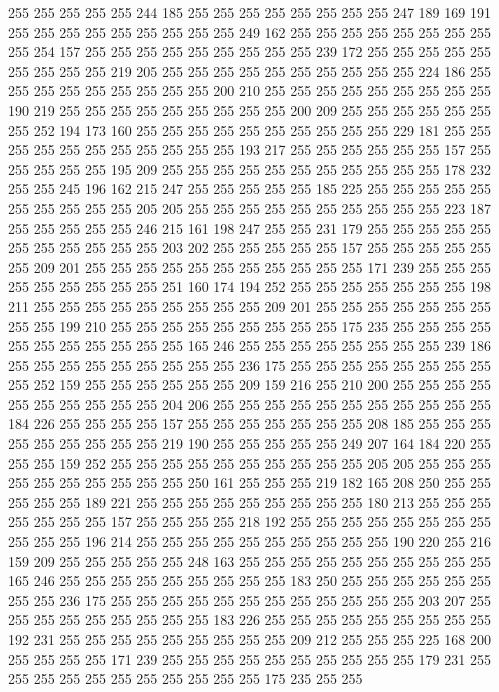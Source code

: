 255 255 255 255 255 244 185 255 255 255 255 255 255 255 255 247 189 169 191 255
255 255 255 255 255 255 255 255 249 162 255 255 255 255 255 255 255 255 255 254
157 255 255 255 255 255 255 255 255 255 239 172 255 255 255 255 255 255 255 255
255 219 205 255 255 255 255 255 255 255 255 255 255 224 186 255 255 255 255 255
255 255 255 255 200 210 255 255 255 255 255 255 255 255 255 190 219 255 255 255
255 255 255 255 255 255 200 209 255 255 255 255 255 255 255 252 194 173 160 255
255 255 255 255 255 255 255 255 255 229 181 255 255 255 255 255 255 255 255 255
255 255 193 217 255 255 255 255 255 255 157 255 255 255 255 255 195 209 255 255
255 255 255 255 255 255 255 255 255 178 232 255 255 245 196 162 215 247 255 255
255 255 255 185 225 255 255 255 255 255 255 255 255 255 255 205 205 255 255 255
255 255 255 255 255 255 255 223 187 255 255 255 255 255 246 215 161 198 247 255
255 231 179 255 255 255 255 255 255 255 255 255 255 255 203 202 255 255 255 255
255 157 255 255 255 255 255 255 209 201 255 255 255 255 255 255 255 255 255 255
255 171 239 255 255 255 255 255 255 255 255 255 251 160 174 194 252 255 255 255
255 255 255 255 198 211 255 255 255 255 255 255 255 255 255 209 201 255 255 255
255 255 255 255 255 255 199 210 255 255 255 255 255 255 255 255 255 175 235 255
255 255 255 255 255 255 255 255 255 255 165 246 255 255 255 255 255 255 255 255
239 186 255 255 255 255 255 255 255 255 255 236 175 255 255 255 255 255 255 255
255 255 252 159 255 255 255 255 255 255 209 159 216 255 210 200 255 255 255 255
255 255 255 255 255 255 204 206 255 255 255 255 255 255 255 255 255 255 255 184
226 255 255 255 255 157 255 255 255 255 255 255 255 208 185 255 255 255 255 255
255 255 255 255 219 190 255 255 255 255 255 249 207 164 184 220 255 255 255 159
252 255 255 255 255 255 255 255 255 255 255 205 205 255 255 255 255 255 255 255
255 255 255 250 161 255 255 255 219 182 165 208 250 255 255 255 255 255 189 221
255 255 255 255 255 255 255 255 255 180 213 255 255 255 255 255 255 255 157 255
255 255 255 218 192 255 255 255 255 255 255 255 255 255 255 255 196 214 255 255
255 255 255 255 255 255 255 255 190 220 255 216 159 209 255 255 255 255 255 248
163 255 255 255 255 255 255 255 255 255 255 165 246 255 255 255 255 255 255 255
255 255 183 250 255 255 255 255 255 255 255 255 236 175 255 255 255 255 255 255
255 255 255 255 255 255 203 207 255 255 255 255 255 255 255 255 255 183 226 255
255 255 255 255 255 255 255 255 192 231 255 255 255 255 255 255 255 255 255 209
212 255 255 255 225 168 200 255 255 255 255 171 239 255 255 255 255 255 255 255
255 255 255 179 231 255 255 255 255 255 255 255 255 255 255 255 175 235 255 255
